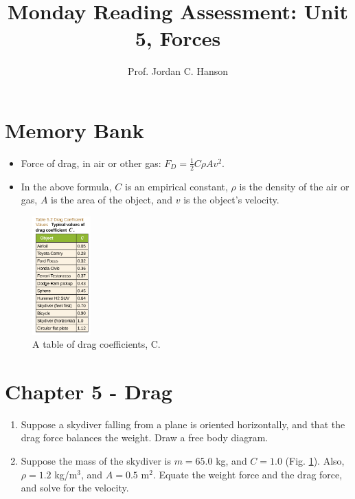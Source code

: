 \documentclass{article}
\begin{document}
\title{Monday Reading Assessment: Unit 5, Forces}
\author{Prof. Jordan C. Hanson}

\maketitle

\section{Memory Bank}

\begin{itemize}
\item Force of drag, in air or other gas: $F_D = \frac{1}{2}C \rho A v^2$.
\item In the above formula, $C$ is an empirical constant, $\rho$ is the density of the air or gas, $A$ is the area of the object, and $v$ is the object's velocity.
\end{itemize}
\begin{figure}[ht]
\centering
\includegraphics[width=0.2\textwidth]{drag.png}
\caption{\label{fig:drag} A table of drag coefficients, C.}
\end{figure}
\section{Chapter 5 - Drag}
\begin{enumerate}
\item Suppose a skydiver falling from a plane is oriented horizontally, and that the drag force balances the weight.  Draw a free body diagram. \\ \vspace{2cm}
\item Suppose the mass of the skydiver is $m = 65.0$ kg, and $C = 1.0$ (Fig. \ref{fig:drag}).  Also, $\rho = 1.2$ kg/m$^3$, and $A = 0.5$ m$^2$.  Equate the weight force and the drag force, and solve for the velocity.
\end{enumerate}
\end{document}
